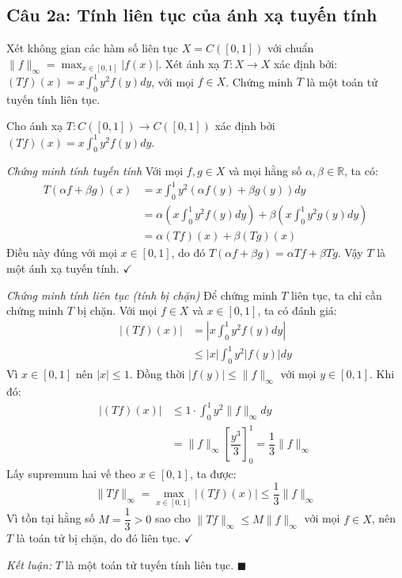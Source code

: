 \subsection*{Câu 2a: Tính liên tục của ánh xạ tuyến tính}

\begin{questionbox}
Xét không gian các hàm số liên tục $X = C([0, 1])$ với chuẩn $\|f\|_\infty = \max_{x \in [0, 1]} |f(x)|$. Xét ánh xạ $T : X \to X$ xác định bởi: $(Tf)(x) = x \int_0^1 y^2 f(y) dy$, với mọi $f \in X$. Chứng minh $T$ là một toán tử tuyến tính liên tục.
\end{questionbox}

\begin{solution}
Cho ánh xạ $T: C([0,1]) \to C([0,1])$ xác định bởi $(Tf)(x) = x \int_0^1 y^2 f(y) dy$.

\textit{Chứng minh tính tuyến tính}
Với mọi $f, g \in X$ và mọi hằng số $\alpha, \beta \in \mathbb{R}$, ta có:
\begin{align*}
    T(\alpha f + \beta g)(x) &= x \int_0^1 y^2 (\alpha f(y) + \beta g(y)) dy \\
    &= \alpha \left( x \int_0^1 y^2 f(y) dy \right) + \beta \left( x \int_0^1 y^2 g(y) dy \right) \\
    &= \alpha (Tf)(x) + \beta (Tg)(x)
\end{align*}
Điều này đúng với mọi $x \in [0,1]$, do đó $T(\alpha f + \beta g) = \alpha Tf + \beta Tg$. 
Vậy $T$ là một ánh xạ tuyến tính. $\checkmark$

\textit{Chứng minh tính liên tục (tính bị chặn)}
Để chứng minh $T$ liên tục, ta chỉ cần chứng minh $T$ bị chặn.
Với mọi $f \in X$ và $x \in [0,1]$, ta có đánh giá:
\begin{align*}
    |(Tf)(x)| &= \left| x \int_0^1 y^2 f(y) dy \right| \\
    &\leq |x| \int_0^1 y^2 |f(y)| dy
\end{align*}
Vì $x \in [0,1]$ nên $|x| \leq 1$. Đồng thời $|f(y)| \leq \|f\|_\infty$ với mọi $y \in [0,1]$. Khi đó:
\begin{align*}
    |(Tf)(x)| &\leq 1 \cdot \int_0^1 y^2 \|f\|_\infty dy \\
    &= \|f\|_\infty \left[ \dfrac{y^3}{3} \right]_0^1 = \dfrac{1}{3} \|f\|_\infty
\end{align*}
Lấy supremum hai vế theo $x \in [0,1]$, ta được:
\[
    \|Tf\|_\infty = \max_{x \in [0,1]} |(Tf)(x)| \leq \dfrac{1}{3} \|f\|_\infty
\]
Vì tồn tại hằng số $M = \dfrac{1}{3} > 0$ sao cho $\|Tf\|_\infty \leq M\|f\|_\infty$ với mọi $f \in X$, nên $T$ là toán tử bị chặn, do đó liên tục. $\checkmark$

\textit{Kết luận:} $T$ là một toán tử tuyến tính liên tục. $\blacksquare$
\end{solution}

